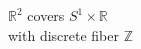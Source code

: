 \documentclass[preview]{standalone}
\begin{document}
\begin{center}
$\mathbb{R}^2$ covers $S^1 \times \mathbb{R}$\\with discrete fiber $\mathbb{Z}$
\end{center}
\end{document}
